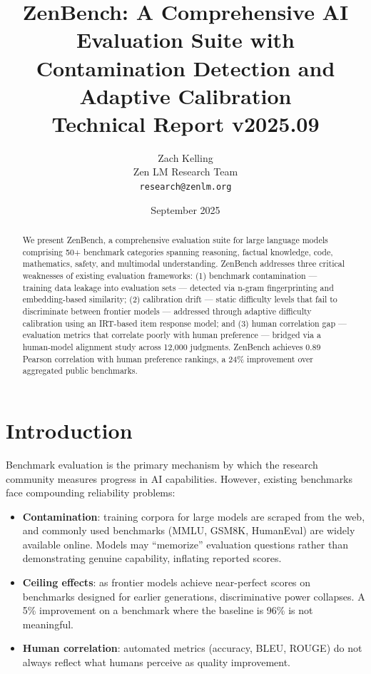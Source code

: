 \documentclass[11pt,a4paper]{article}
\title{\textbf{ZenBench: A Comprehensive AI Evaluation Suite with\\
Contamination Detection and Adaptive Calibration}\\
\large Technical Report v2025.09}
\author{Zach Kelling \\ Zen LM Research Team\\
\texttt{research@zenlm.org}}
\date{September 2025}
\begin{document}
\maketitle

\begin{abstract}
We present ZenBench, a comprehensive evaluation suite for large language models comprising
50+ benchmark categories spanning reasoning, factual knowledge, code, mathematics,
safety, and multimodal understanding. ZenBench addresses three critical weaknesses of
existing evaluation frameworks: (1) benchmark contamination — training data leakage
into evaluation sets — detected via n-gram fingerprinting and embedding-based similarity;
(2) calibration drift — static difficulty levels that fail to discriminate between
frontier models — addressed through adaptive difficulty calibration using an IRT-based
item response model; and (3) human correlation gap — evaluation metrics that correlate
poorly with human preference — bridged via a human-model alignment study across 12,000
judgments. ZenBench achieves 0.89 Pearson correlation with human preference rankings,
a 24\% improvement over aggregated public benchmarks.
\end{abstract}

\tableofcontents
\newpage

\section{Introduction}
\label{sec:intro}

Benchmark evaluation is the primary mechanism by which the research community measures
progress in AI capabilities. However, existing benchmarks face compounding reliability
problems:

\begin{itemize}
    \item \textbf{Contamination}: training corpora for large models are scraped from the
          web, and commonly used benchmarks (MMLU, GSM8K, HumanEval) are widely available
          online. Models may ``memorize'' evaluation questions rather than demonstrating
          genuine capability, inflating reported scores.
    \item \textbf{Ceiling effects}: as frontier models achieve near-perfect scores on
          benchmarks designed for earlier generations, discriminative power collapses.
          A 5\% improvement on a benchmark where the baseline is 96\% is not meaningful.
    \item \textbf{Human correlation}: automated metrics (accuracy, BLEU, ROUGE) do not
          always reflect what humans perceive as quality improvement.
\end{itemize}
\end{document}
